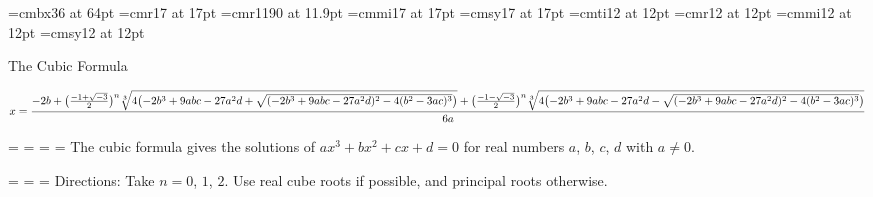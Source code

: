 \ifx\pdfoutput\undefined\relax\else      %
\pdfpagewidth=297mm
\pdfpageheight=210mm
\pdfhorigin=0mm
\pdfvorigin=0mm\fi
\hsize=297mm
\vsize=210mm
\nopagenumbers
\font\tit=cmbx36 at 64pt
\font\desc=cmr17 at 17pt
\font\descscript=cmr1190 at 11.9pt
\font\descmath=cmmi17 at 17pt
\font\descsy=cmsy17 at 17pt
\font\dir=cmti12 at 12pt
\font\dirdigit=cmr12 at 12pt
\font\dirmath=cmmi12 at 12pt
\font\dirsy=cmsy12 at 12pt
\hbox{}
\vfill
\centerline{\tit The Cubic Formula}
\vskip 25mm
$$ x = {-2b + \bigl({-1+\sqrt{-3}\over2}\bigr)^n\root3\of{4\bigl(-2b^3+9abc-27a^2d+\sqrt{(-2b^3+9abc-27a^2d)^2-4(b^2-3ac)^3}\bigr)}+\bigl({-1-\sqrt{-3}\over2}\bigr)^n\root3\of{4\bigl(-2b^3+9abc-27a^2d-\sqrt{(-2b^3+9abc-27a^2d)^2-4(b^2-3ac)^3}\bigr)} \over 6a} $$
\vskip 25mm
\centerline{\desc
{}=\desc
{}=\descscript
{}=\descmath
{}=\descsy
The cubic formula gives the solutions of $ax^3+bx^2+cx+d=0$ for real numbers $a$, $b$, $c$, $d$ with $a\neq0$.}
\vskip 10mm
\centerline{\dir
{}=\dirdigit
{}=\dirmath
{}=\dirsy
Directions: Take\/ $n=0$, $1$, $2$.  Use real cube roots if possible, and principal roots otherwise.}
\bye
